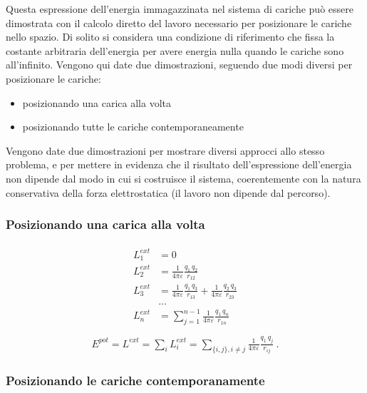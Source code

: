 \documentclass[letterpaper,10pt,italian]{jupyterBook}
\begin{document}
\sphinxAtStartPar
Questa espressione dell’energia immagazzinata nel sistema di cariche può essere dimostrata con il calcolo diretto del lavoro necessario per posizionare le cariche nello spazio. Di solito si considera una condizione di riferimento che fissa la costante arbitraria dell’energia per avere energia nulla quando le cariche sono all’infinito.
Vengono qui date due dimostrazioni, seguendo due modi diversi per posizionare le cariche:
\begin{itemize}
\item {} 
\sphinxAtStartPar
posizionando una carica alla volta

\item {} 
\sphinxAtStartPar
posizionando tutte le cariche contemporaneamente

\end{itemize}

\sphinxAtStartPar
Vengono date due dimostrazioni per mostrare diversi approcci allo stesso problema, e per mettere in evidenza che il risultato dell’espressione dell’energia non dipende dal modo in cui si costruisce il sistema, coerentemente con la natura conservativa della forza elettrostatica (il lavoro non dipende dal percorso).


\subsubsection*{Posizionando una carica alla volta}
\begin{equation*}
\begin{split}\begin{aligned}
  L^{ext}_1 & = 0 \\
  L^{ext}_2 & = \frac{1}{4 \pi \varepsilon} \frac{q_1 \, q_2}{r_{12}}  \\
  L^{ext}_3 & = \frac{1}{4 \pi \varepsilon} \frac{q_1 \, q_3}{r_{13}} + \frac{1}{4 \pi \varepsilon} \frac{q_2 \, q_3}{r_{23}}  \\
            & ... \\
  L^{ext}_n & = \sum_{j=1}^{n-1} \frac{1}{4 \pi \varepsilon} \frac{q_1 \, q_n}{r_{1n}} \\
\end{aligned}\end{split}
\end{equation*}\begin{equation*}
\begin{split}E^{pot} = L^{ext} = \sum_i L^{ext}_i = \sum_{\{i, j\}, i \ne j} \frac{1}{4 \pi \varepsilon} \frac{q_1 \, q_j}{r_{ij}} \ .\end{split}
\end{equation*}\subsubsection*{Posizionando le cariche contemporanamente}
\end{document}
